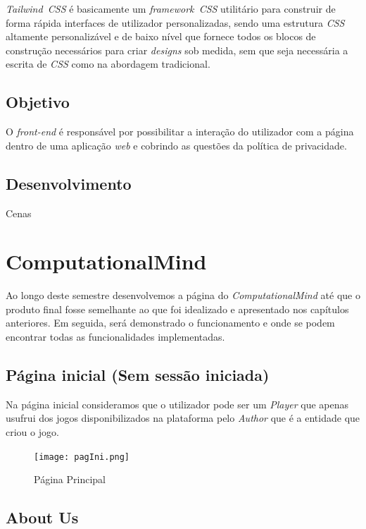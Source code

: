 \documentclass[11pt,a4paper]{report}
\begin{document}
\emph{Tailwind\ CSS} é basicamente um \emph{framework\ CSS} utilitário para construir de forma rápida interfaces de utilizador personalizadas, sendo uma estrutura \emph{CSS} altamente personalizável e de baixo nível que fornece todos os blocos de construção necessários para criar \emph{designs} sob medida, sem que seja necessária a escrita de \emph{CSS} como na abordagem tradicional.

\section{Objetivo}

O \emph{front-end} é responsável por possibilitar a interação do utilizador com a página dentro de uma aplicação \emph{web} e cobrindo as questões da política de privacidade.

\section{Desenvolvimento}

Cenas

\chapter{ComputationalMind}

Ao longo deste semestre desenvolvemos a página do \emph{ComputationalMind} até que o produto final fosse semelhante ao que foi idealizado e apresentado nos capítulos anteriores. Em seguida, será demonstrado o funcionamento e onde se podem encontrar todas as funcionalidades implementadas.

\section{Página inicial (Sem sessão iniciada)}

Na página inicial consideramos que o utilizador pode ser um \emph{Player} que apenas usufrui dos jogos disponibilizados na plataforma pelo \emph{Author} que é a entidade que criou o jogo.\newline\newline

\begin{figure}[h]
    \centering
    \texttt{[image: pagIni.png]}
    \caption{Página Principal}
    \label{fig:pagIni}
\end{figure}

\newpage

\section{About Us}
\end{document}

